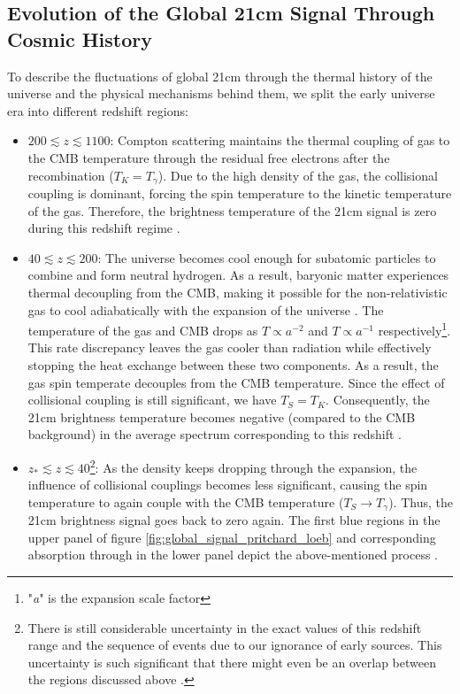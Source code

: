 \documentclass[12pt, TexShade, letterpaper]{report}
\begin{document}
\subsection{Evolution of the Global 21cm Signal Through Cosmic History}
To describe the fluctuations of global 21cm through the thermal history of the universe and the physical mechanisms behind them, we split the early universe era into different redshift regions:\par
\begin{itemize}
\item $200 \lesssim z \lesssim 1100$: Compton scattering maintains the thermal coupling of gas to the CMB temperature through the residual free electrons after the recombination ($T_K = T_\gamma$). Due to the high density of the gas, the collisional coupling is dominant, forcing the spin temperature to the kinetic temperature of the gas. Therefore, the brightness temperature of the 21cm signal is zero during this redshift regime \cite{21century}.\par

\item $40 \lesssim z \lesssim 200$: The universe becomes cool enough for subatomic particles to combine and form neutral hydrogen. As a result, baryonic matter experiences thermal decoupling from the CMB, making it possible for the non-relativistic gas to cool adiabatically with the expansion of the universe \cite{21century}. The temperature of the gas and CMB drops as $T\propto a^{-2}$ and $T\propto a^{-1}$ respectively\footnote{"\emph{a}" is the expansion scale factor}. This rate discrepancy leaves the gas cooler than radiation while effectively stopping the heat exchange between these two components. As a result, the gas spin temperate decouples from the CMB temperature. Since the effect of collisional coupling is still significant, we have $T_S = T_K$. Consequently, the 21cm brightness temperature becomes negative (compared to the CMB background) in the average spectrum corresponding to this redshift \cite{map_universe, 21century}.\par

\item $z_* \lesssim z \lesssim 40$\footnote{There is still considerable uncertainty in the exact values of this redshift range and the sequence of events due to our ignorance of early sources. This uncertainty is such significant that there might even be an overlap between the regions discussed above \cite{21century}.}: As the density keeps dropping through the expansion, the influence of collisional couplings becomes less significant, causing the spin temperature to again couple with the CMB temperature ($T_S \rightarrow T_\gamma$). Thus, the 21cm brightness signal goes back to zero again\cite{map_universe}. The first blue regions in the upper panel of figure \ref{fig:global_signal_pritchard_loeb} and corresponding absorption through in the lower panel depict the above-mentioned process \cite{map_universe, 21century}.\par


\end{itemize}
\end{document}
